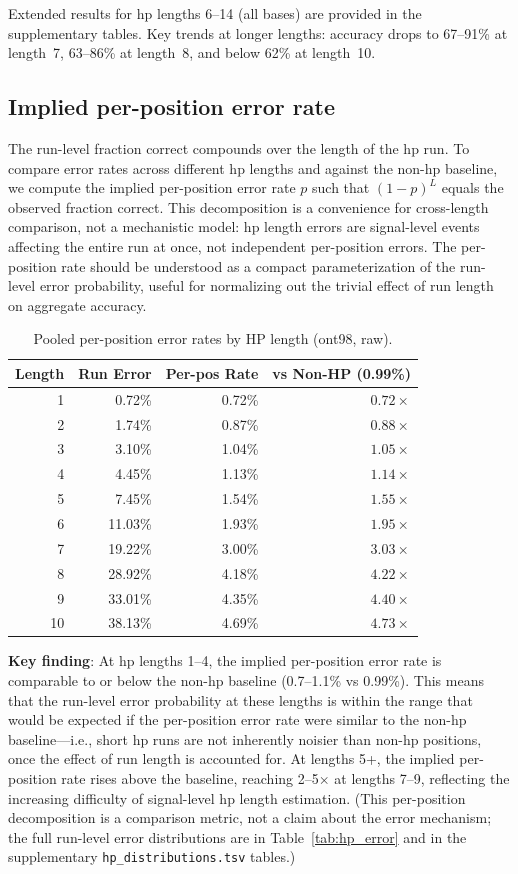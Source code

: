 \documentclass[11pt]{article}
\begin{document}
Extended results for hp lengths 6--14 (all bases) are provided in the
supplementary tables. Key trends at longer lengths: accuracy drops to
67--91\% at length~7, 63--86\% at length~8, and below 62\% at length~10.

\subsection{Implied per-position error rate}

The run-level fraction correct compounds over the length of the hp run. To
compare error rates across different hp lengths and against the non-hp
baseline, we compute the implied per-position error rate $p$ such that
$(1-p)^L$ equals the observed fraction correct. This decomposition is a
convenience for cross-length comparison, not a mechanistic model: hp length
errors are signal-level events affecting the entire run at once, not
independent per-position errors. The per-position rate should be understood as
a compact parameterization of the run-level error probability, useful for
normalizing out the trivial effect of run length on aggregate accuracy.

\begin{table}[h]
\centering
\caption{Pooled per-position error rates by HP length (ont98, raw).}
\label{tab:per_pos}
\begin{tabular}{rrrr}
\toprule
Length & Run Error & Per-pos Rate & vs Non-HP (0.99\%) \\
\midrule
1 & 0.72\% & 0.72\% & $0.72\times$ \\
2 & 1.74\% & 0.87\% & $0.88\times$ \\
3 & 3.10\% & 1.04\% & $1.05\times$ \\
4 & 4.45\% & 1.13\% & $1.14\times$ \\
5 & 7.45\% & 1.54\% & $1.55\times$ \\
6 & 11.03\% & 1.93\% & $1.95\times$ \\
7 & 19.22\% & 3.00\% & $3.03\times$ \\
8 & 28.92\% & 4.18\% & $4.22\times$ \\
9 & 33.01\% & 4.35\% & $4.40\times$ \\
10 & 38.13\% & 4.69\% & $4.73\times$ \\
\bottomrule
\end{tabular}
\end{table}

\textbf{Key finding}: At hp lengths 1--4, the implied per-position error rate
is comparable to or below the non-hp baseline (0.7--1.1\% vs 0.99\%). This
means that the run-level error probability at these lengths is within the range
that would be expected if the per-position error rate were similar to the
non-hp baseline---i.e., short hp runs are not inherently noisier than non-hp
positions, once the effect of run length is accounted for. At lengths 5+, the
implied per-position rate rises above the baseline, reaching
2--5$\times$ at lengths 7--9, reflecting the increasing difficulty of
signal-level hp length estimation. (This per-position decomposition is a
comparison metric, not a claim about the error mechanism; the full run-level
error distributions are in Table~\ref{tab:hp_error} and in the supplementary
\texttt{hp\_distributions.tsv} tables.)
\end{document}
